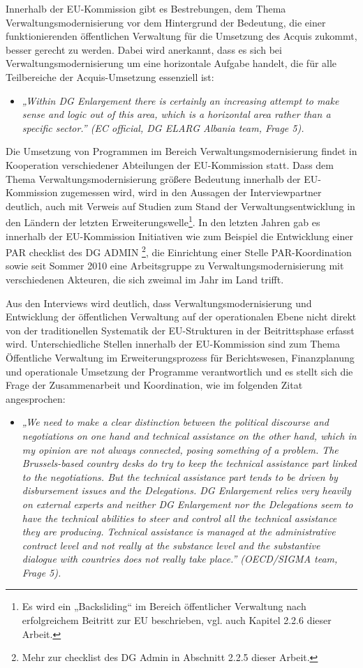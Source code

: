 Innerhalb der EU-Kommission gibt es Bestrebungen, dem Thema Verwaltungsmodernisierung vor dem Hintergrund der Bedeutung, die einer funktionierenden öffentlichen Verwaltung für die Umsetzung des Acquis zukommt, besser gerecht zu werden. Dabei wird anerkannt, dass es sich bei Verwaltungsmodernisierung um eine horizontale Aufgabe handelt, die für alle Teilbereiche der Acquis-Umsetzung essenziell ist:
\begin{itemize}[label={}]
\item \textit{„Within DG Enlargement there is certainly an increasing attempt to make sense and logic out of this area, which is a horizontal area rather than a specific sector.” (EC official, DG ELARG Albania team, Frage 5). }
\end{itemize}
Die Umsetzung von Programmen im Bereich Verwaltungsmodernisierung findet in Kooperation verschiedener Abteilungen der EU-Kommission statt. Dass dem Thema Verwaltungsmodernisierung größere Bedeutung innerhalb der EU-Kommission zugemessen wird, wird in den Aussagen der Interviewpartner deutlich, auch mit Verweis auf Studien zum Stand der Verwaltungsentwicklung in den Ländern der letzten Erweiterungswelle\footnote{Es wird ein „Backsliding“ im Bereich öffentlicher Verwaltung nach erfolgreichem Beitritt zur EU beschrieben, vgl. auch Kapitel 2.2.6 dieser Arbeit.}. In den letzten Jahren gab es innerhalb der EU-Kommission Initiativen wie zum Beispiel die Entwicklung einer PAR checklist des DG ADMIN \footnote{Mehr zur checklist des DG Admin in Abschnitt 2.2.5 dieser Arbeit.}, die Einrichtung einer Stelle PAR-Koordination sowie seit Sommer 2010 eine Arbeitsgruppe zu Verwaltungsmodernisierung mit verschiedenen Akteuren, die sich zweimal im Jahr im Land trifft.\par
Aus den Interviews wird deutlich, dass Verwaltungsmodernisierung und Entwicklung der öffentlichen Verwaltung auf der operationalen Ebene nicht direkt von der traditionellen Systematik der EU-Strukturen in der Beitrittsphase erfasst wird. Unterschiedliche Stellen innerhalb der EU-Kommission sind zum Thema Öffentliche Verwaltung im Erweiterungsprozess für Berichtswesen, Finanzplanung und operationale Umsetzung der Programme verantwortlich und es stellt sich die Frage der Zusammenarbeit und Koordination, wie im folgenden Zitat angesprochen:
\begin{itemize}[label={}]
\item \textit{„We need to make a clear distinction between the political discourse and negotiations on one hand and technical assistance on the other hand, which in my opinion are not always connected, posing something of a problem. The Brussels-based country desks do try to keep the technical assistance part linked to the negotiations. But the technical assistance part tends to be driven by disbursement issues and the Delegations. DG Enlargement relies very heavily on external experts and neither DG Enlargement nor the Delegations seem to have the technical abilities to steer and control all the technical assistance they are producing. Technical assistance is managed at the administrative contract level and not really at the substance level and the substantive dialogue with countries does not really take place.” (OECD/SIGMA team, Frage 5).}
\end{itemize}

